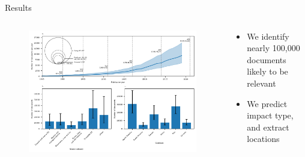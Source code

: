\documentclass[9pt]{beamer}
\begin{document}
\begin{frame}{Results}

\begin{columns}
	\begin{column}{0.618\linewidth}
		\begin{figure}
			\includegraphics[width=\linewidth]{../figures/figure_1.png}
		\end{figure}
	\end{column}
	\begin{column}{0.382\linewidth}
		\begin{itemize}
			\item We identify nearly 100,000 documents likely to be relevant
			\item We predict impact type, and extract locations
		\end{itemize}
	
	\end{column}
\end{columns}

\end{frame}

\end{document}
